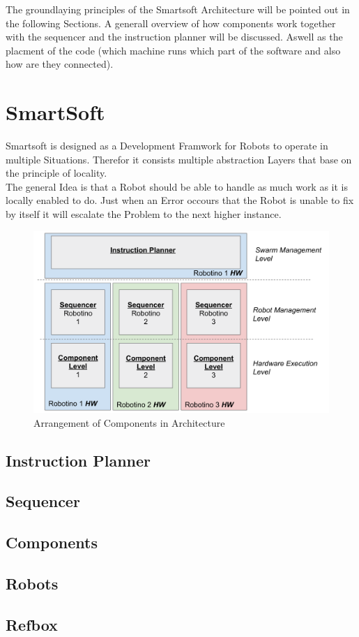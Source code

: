 The groundlaying principles of the Smartsoft Architecture will be pointed out in the following
Sections. A generall overview of how components work together with the sequencer and the instruction planner will be discussed.
Aswell as the placment of the code (which machine runs which part of the software and also how are they connected).

\section{SmartSoft}
Smartsoft is designed as a Development Framwork for Robots to operate in multiple Situations.
Therefor it consists multiple abstraction Layers that base on the principle of
locality. \\
The general Idea is that a Robot should be able to handle as much work as it is locally enabled to do.
Just when an Error occours that the Robot is unable to fix by itself it will escalate the Problem to the next higher instance.
\begin{figure}[h]
\centering
\includegraphics[scale=0.23]{pic/architecture2018.png}
\caption{Arrangement of Components in Architecture}
\label{fig:architecture_overview}
\end{figure}

    \subsection{Instruction Planner}
    \subsection{Sequencer}
    \subsection{Components}
    \subsection{Robots}
    \subsection{Refbox}
